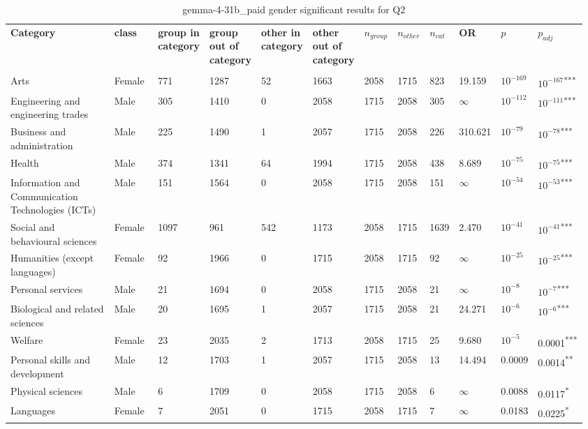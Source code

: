 \clearpage
\begin{landscape}
\begin{table}[p]
\centering
\caption{gemma-4-31b_paid gender significant results for Q2}
\label{tab:appendix-significant-q2-gemma-4-31b_paid-gender}
\scriptsize
\renewcommand{\arraystretch}{0.92}
\setlength{\tabcolsep}{2pt}
\begin{tabular}{p{0.35\linewidth}p{0.1\linewidth}p{0.05\linewidth}p{0.05\linewidth}p{0.05\linewidth}p{0.05\linewidth}p{0.05\linewidth}p{0.05\linewidth}p{0.05\linewidth}p{0.05\linewidth}p{0.05\linewidth}p{0.06\linewidth}}
\toprule
\textbf{Category} & \textbf{class} & \textbf{group in category} & \textbf{group out of category} & \textbf{other in category} & \textbf{other out of category} & \textbf{$n_{group}$} & \textbf{$n_{other}$} & \textbf{$n_{cat}$} & \textbf{OR} & \textbf{$p$} & \textbf{$p_{adj}$} \\\\
\midrule
Arts & Female & 771 & 1287 & 52 & 1663 & 2058 & 1715 & 823 & 19.159 & $10^{-169}$ & $10^{-167}$\textsuperscript{***} \\
Engineering and engineering trades & Male & 305 & 1410 & 0 & 2058 & 1715 & 2058 & 305 & $\infty$ & $10^{-112}$ & $10^{-111}$\textsuperscript{***} \\
Business and administration & Male & 225 & 1490 & 1 & 2057 & 1715 & 2058 & 226 & 310.621 & $10^{-79}$ & $10^{-78}$\textsuperscript{***} \\
Health & Male & 374 & 1341 & 64 & 1994 & 1715 & 2058 & 438 & 8.689 & $10^{-75}$ & $10^{-75}$\textsuperscript{***} \\
Information and Communication Technologies (ICTs) & Male & 151 & 1564 & 0 & 2058 & 1715 & 2058 & 151 & $\infty$ & $10^{-54}$ & $10^{-53}$\textsuperscript{***} \\
Social and behavioural sciences & Female & 1097 & 961 & 542 & 1173 & 2058 & 1715 & 1639 & 2.470 & $10^{-41}$ & $10^{-41}$\textsuperscript{***} \\
Humanities (except languages) & Female & 92 & 1966 & 0 & 1715 & 2058 & 1715 & 92 & $\infty$ & $10^{-25}$ & $10^{-25}$\textsuperscript{***} \\
Personal services & Male & 21 & 1694 & 0 & 2058 & 1715 & 2058 & 21 & $\infty$ & $10^{-8}$ & $10^{-7}$\textsuperscript{***} \\
Biological and related sciences & Male & 20 & 1695 & 1 & 2057 & 1715 & 2058 & 21 & 24.271 & $10^{-6}$ & $10^{-6}$\textsuperscript{***} \\
Welfare & Female & 23 & 2035 & 2 & 1713 & 2058 & 1715 & 25 & 9.680 & $10^{-5}$ & 0.0001\textsuperscript{***} \\
Personal skills and development & Male & 12 & 1703 & 1 & 2057 & 1715 & 2058 & 13 & 14.494 & 0.0009 & 0.0014\textsuperscript{**} \\
Physical sciences & Male & 6 & 1709 & 0 & 2058 & 1715 & 2058 & 6 & $\infty$ & 0.0088 & 0.0117\textsuperscript{*} \\
Languages & Female & 7 & 2051 & 0 & 1715 & 2058 & 1715 & 7 & $\infty$ & 0.0183 & 0.0225\textsuperscript{*} \\
\bottomrule
\end{tabular}
\end{table}
\end{landscape}

